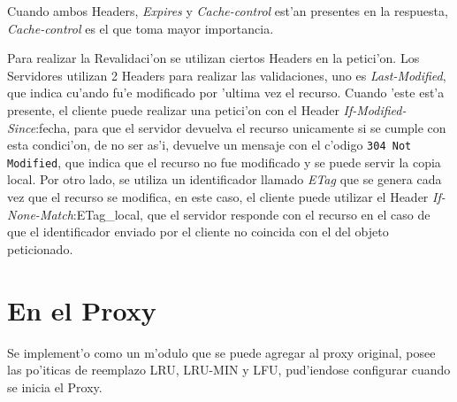 Cuando ambos Headers, \textsl{Expires} y \textsl{Cache-control} est'an presentes en la respuesta, \textsl{Cache-control} es el que toma mayor importancia.

Para realizar la Revalidaci'on se utilizan ciertos Headers en la petici'on. Los Servidores utilizan 2 Headers para realizar las validaciones, uno es \textsl{Last-Modified}, que indica cu'ando fu'e modificado por 'ultima vez el recurso. Cuando 'este est'a presente, el cliente puede realizar una petici'on con el Header \textsl{If-Modified-Since}:fecha, para que el servidor devuelva el recurso unicamente si se cumple con esta condici'on, de no ser as'i, devuelve un mensaje con el c'odigo \texttt{304 Not Modified}, que indica que el recurso no fue modificado y se puede servir la copia local.
Por otro lado, se utiliza un identificador llamado \textsl{ETag} que se genera cada vez que el recurso se modifica, en este caso, el cliente puede utilizar el Header \textsl{If-None-Match}:ETag\_local, que el servidor responde con el recurso en el caso de que el identificador enviado por el cliente no coincida con el del objeto peticionado.

\section{En el Proxy}

Se implement'o como un m'odulo que se puede agregar al proxy original, posee las po'iticas de reemplazo LRU, LRU-MIN y LFU, pud'iendose configurar cuando se inicia el Proxy.